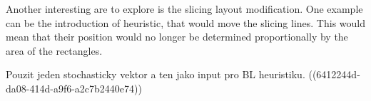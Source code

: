 
Another interesting are to explore is the slicing layout modification.
One example can be the introduction of heuristic, that would move the slicing lines.
This would mean that their position would no longer be determined proportionally by the area of the rectangles.


Pouzit jeden stochasticky vektor a ten jako input pro BL heuristiku.
((6412244d-da08-414d-a9f6-a2c7b2440e74))








